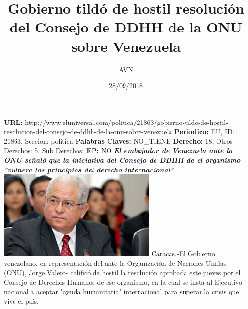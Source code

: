 \documentclass{article}%
\title{\textbf{Gobierno tildó de hostil resolución del Consejo de DDHH de la ONU sobre Venezuela}}%
\author{AVN}%
\date{28/09/2018}%
\begin{document}
%
\normalsize%
\maketitle%
\textbf{URL: }%
http://www.eluniversal.com/politica/21863/gobierno{-}tildo{-}de{-}hostil{-}resolucion{-}del{-}consejo{-}de{-}ddhh{-}de{-}la{-}onu{-}sobre{-}venezuela\newline%
%
\textbf{Periodico: }%
EU, %
ID: %
21863, %
Seccion: %
politica\newline%
%
\textbf{Palabras Claves: }%
NO\_TIENE\newline%
%
\textbf{Derecho: }%
18, %
Otros Derechos: %
5, %
Sub Derechos: %
\newline%
%
\textbf{EP: }%
NO\newline%
\newline%
%
\textbf{\textit{El embajador de Venezuela ante la ONU señaló que la iniciativa del Consejo de DDHH de el organismo "vulnera los principios del derecho internacional"}}%
\newline%
\newline%
%
\includegraphics[width=300px]{137.jpg}%
\newline%
%
Caracas.{-}El Gobierno venezolano, en representación del ante la Organización de Naciones Unidas (ONU), Jorge Valero{-} calificó de hostil la resolución aprobada este jueves por el Consejo de Derechos Humanos de ese organismo, en la cual se insta al Ejecutivo nacional a aceptar "ayuda humanitaria" internacional para superar la crisis que vive el país.%
\newline%
%
\end{document}
